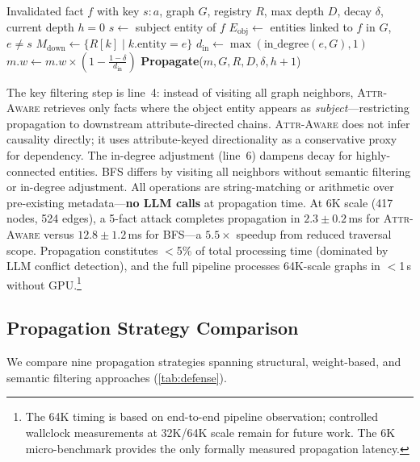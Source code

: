 \documentclass{article}
\newcommand{\attraware}{\textsc{Attr-Aware}}
\newcommand{\bfsprop}{\textsc{BFS}}
\begin{document}
\begin{algorithm}[htbp]
\caption{\attraware{} Selective Propagation}
\label{alg:attraware}
\begin{algorithmic}[1]
\REQUIRE Invalidated fact $f$ with key $s{:}a$, graph $G$, registry $R$, max depth $D$, decay $\delta$, current depth $h{=}0$
\STATE $s \leftarrow$ subject entity of $f$
\STATE $E_{\text{obj}} \leftarrow$ entities linked to $f$ in $G$, $e \neq s$
  \STATE $M_{\text{down}} \leftarrow \{R[k] \mid k.\text{entity} = e\}$ 
    \STATE $d_{\text{in}} \leftarrow \max(\text{in\_degree}(e, G), 1)$
    \STATE $m.w \leftarrow m.w \times (1 - \frac{1-\delta}{d_{\text{in}}})$
      \STATE \textbf{Propagate}($m, G, R, D, \delta, h{+}1$)
    \ENDIF
  \ENDFOR
\ENDFOR
\end{algorithmic}
\end{algorithm}

The key filtering step is line~4: instead of visiting all graph neighbors, \attraware{} retrieves only facts where the object entity appears as \textit{subject}---restricting propagation to downstream attribute-directed chains.
\attraware{} does not infer causality directly; it uses attribute-keyed directionality as a conservative proxy for dependency.
The in-degree adjustment (line~6) dampens decay for highly-connected entities.
\bfsprop{} differs by visiting all neighbors without semantic filtering or in-degree adjustment.
All operations are string-matching or arithmetic over pre-existing metadata---\textbf{no LLM calls} at propagation time.
At 6K scale (417 nodes, 524 edges), a 5-fact attack completes propagation in $2.3\pm0.2$\,ms for \attraware{} versus $12.8\pm1.2$\,ms for BFS---a $5.5\times$ speedup from reduced traversal scope.
Propagation constitutes $<$5\% of total processing time (dominated by LLM conflict detection), and the full pipeline processes 64K-scale graphs in $<$1\,s without GPU.\footnote{The 64K timing is based on end-to-end pipeline observation; controlled wallclock measurements at 32K/64K scale remain for future work.  The 6K micro-benchmark provides the only formally measured propagation latency.}

\subsection{Propagation Strategy Comparison}

We compare nine propagation strategies spanning structural, weight-based, and semantic filtering approaches (\cref{tab:defense}).
\end{document}
